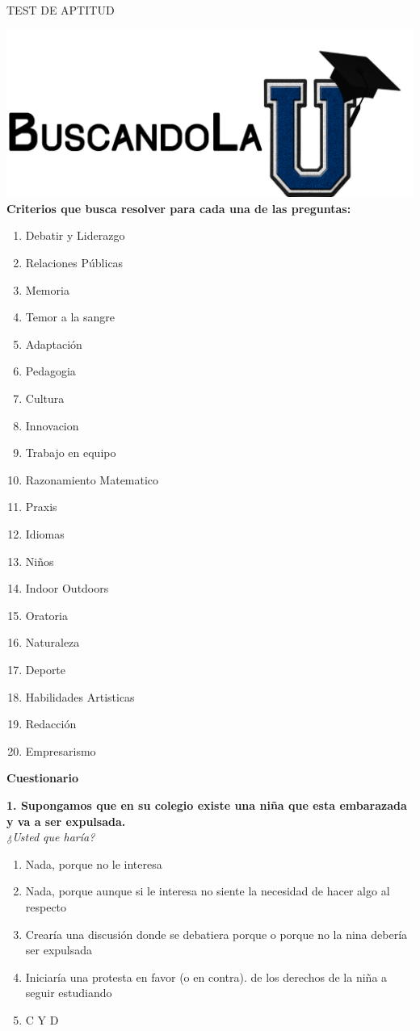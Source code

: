 \documentclass{article}
\begin{document}
\begin{center}
{\Huge TEST DE APTITUD}
\end{center}
 \includegraphics[scale=1]{logo.png} 
\pagebreak \\
\textbf{Criterios que busca resolver para cada una de las preguntas:}
\begin{enumerate}
\item Debatir  y Liderazgo 
\item Relaciones Públicas
\item Memoria
\item Temor a la sangre
\item Adaptación
\item Pedagogia
\item Cultura
\item Innovacion
\item Trabajo en equipo
\item Razonamiento Matematico
\item Praxis
\item Idiomas
\item Niños 
\item Indoor Outdoors
\item Oratoria
\item Naturaleza
\item Deporte
\item Habilidades Artisticas
\item Redacción
\item Empresarismo
\end{enumerate}
\pagebreak
\begin{center}
{\Large \textbf{Cuestionario} } \\
\end{center}
\textbf{1. Supongamos que en su colegio existe una niña que esta embarazada y va a ser expulsada.} \\

\emph{¿Usted que haría?}\\
\begin{enumerate}[label=(\Alph*)]
\item Nada, porque no le interesa
\item Nada, porque aunque si le interesa no siente la necesidad de hacer algo al respecto
\item Crearía una discusión donde se debatiera porque o porque no la nina debería ser expulsada 
\item Iniciaría una protesta en favor (o en contra). de los derechos de la niña a seguir estudiando
\item C Y D
 \end{enumerate}
\end{document}
